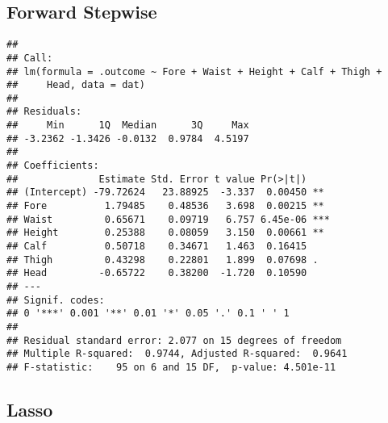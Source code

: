 \documentclass[]{article}
\newenvironment{Shaded}{\begin{snugshade}}{\end{snugshade}}
\newcommand{\KeywordTok}[1]{\textcolor[rgb]{0.13,0.29,0.53}{\textbf{#1}}}
\newcommand{\DataTypeTok}[1]{\textcolor[rgb]{0.13,0.29,0.53}{#1}}
\newcommand{\DecValTok}[1]{\textcolor[rgb]{0.00,0.00,0.81}{#1}}
\newcommand{\StringTok}[1]{\textcolor[rgb]{0.31,0.60,0.02}{#1}}
\newcommand{\CommentTok}[1]{\textcolor[rgb]{0.56,0.35,0.01}{\textit{#1}}}
\newcommand{\OperatorTok}[1]{\textcolor[rgb]{0.81,0.36,0.00}{\textbf{#1}}}
\newcommand{\NormalTok}[1]{#1}
\begin{document}
\subsection{Forward Stepwise}\label{forward-stepwise-1}

\begin{verbatim}
## 
## Call:
## lm(formula = .outcome ~ Fore + Waist + Height + Calf + Thigh + 
##     Head, data = dat)
## 
## Residuals:
##     Min      1Q  Median      3Q     Max 
## -3.2362 -1.3426 -0.0132  0.9784  4.5197 
## 
## Coefficients:
##              Estimate Std. Error t value Pr(>|t|)    
## (Intercept) -79.72624   23.88925  -3.337  0.00450 ** 
## Fore          1.79485    0.48536   3.698  0.00215 ** 
## Waist         0.65671    0.09719   6.757 6.45e-06 ***
## Height        0.25388    0.08059   3.150  0.00661 ** 
## Calf          0.50718    0.34671   1.463  0.16415    
## Thigh         0.43298    0.22801   1.899  0.07698 .  
## Head         -0.65722    0.38200  -1.720  0.10590    
## ---
## Signif. codes:  
## 0 '***' 0.001 '**' 0.01 '*' 0.05 '.' 0.1 ' ' 1
## 
## Residual standard error: 2.077 on 15 degrees of freedom
## Multiple R-squared:  0.9744, Adjusted R-squared:  0.9641 
## F-statistic:    95 on 6 and 15 DF,  p-value: 4.501e-11
\end{verbatim}

\subsection{Lasso}\label{lasso}

\begin{Shaded}
\end{Shaded}
\end{document}
